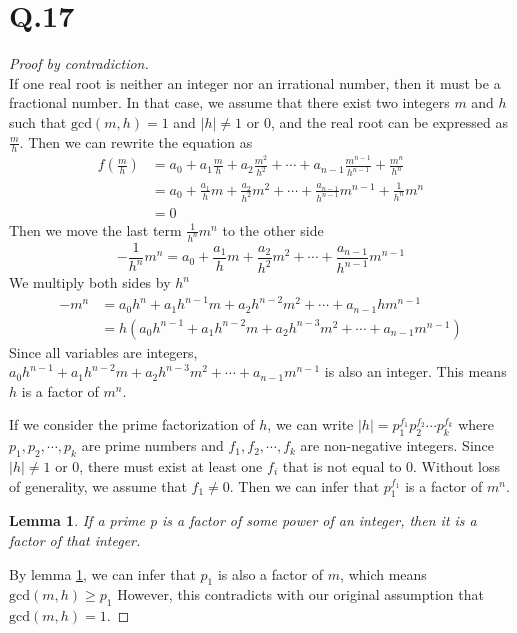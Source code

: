 \documentclass[a4paper,12pt]{article}
\newtheorem{lemma}{Lemma}
\begin{document}
\section*{Q.17}
\begin{proof}[Proof by contradiction]
	$ $\\
	If one real root is neither an integer nor an irrational number, then it must be a fractional number.
	In that case, we assume that there exist two integers $m$ and $h$ such that $\text{gcd} (m,h) = 1$ and $|h| \ne 1$ or $0$, and the real root can be expressed as $\frac{m}{h}$.
	Then we can rewrite the equation as 
	\begin{align*}
		f(\frac{m}{h}) &= a_0 + a_1\frac{m}{h} + a_2\frac{m^2}{h^2} + \cdots + a_{n-1}\frac{m^{n-1}}{h^{n-1}} + \frac{m^n}{h^n}\\
		&= a_0 + \frac{a_1}{h}m + \frac{a_2}{h^2}m^2 + \cdots + \frac{a_{n-1}}{h^{n-1}}m^{n-1} + \frac{1}{h^n}m^n\\
		&= 0
	\end{align*}
	Then we move the last term $\frac{1}{h^n}m^n$ to the other side
	\begin{equation*}
		- \frac{1}{h^n}m^n = a_0 + \frac{a_1}{h}m + \frac{a_2}{h^2}m^2 + \cdots + \frac{a_{n-1}}{h^{n-1}}m^{n-1}
	\end{equation*}
	We multiply both sides by $h^n$
	\begin{align*}
		-m^n &= a_0h^n + a_1h^{n-1}m + a_2h^{n-2}m^2 + \cdots + a_{n-1}hm^{n-1} \\
		&= h(a_0h^{n-1} + a_1h^{n-2}m + a_2h^{n-3}m^2 + \cdots + a_{n-1}m^{n-1})
	\end{align*}
	Since all variables are integers, $a_0h^{n-1} + a_1h^{n-2}m + a_2h^{n-3}m^2 + \cdots + a_{n-1}m^{n-1}$ is also an integer.
	This means $h$ is a factor of $m^n$.

	If we consider the prime factorization of $h$, we can write $|h| = p_1^{f_1}p_2^{f_2}\cdots p_k^{f_k}$ where $p_1,p_2,\cdots,p_k$ are prime numbers and $f_1,f_2,\cdots,f_k$ are non-negative integers.
	Since $|h| \ne 1$ or $0$, there must exist at least one $f_i$ that is not equal to $0$.
	Without loss of generality, we assume that $f_1 \ne 0$.
	Then we can infer that $p_1^{f_1}$ is a factor of $m^n$. 

	\begin{lemma}
		\label{lemma:3}
		If a prime p is a factor of some power of an integer, then it is a factor of that integer.
	\end{lemma}

	By lemma \ref{lemma:3}, we can infer that $p_1$ is also a factor of $m$, which means $\text{gcd} (m,h) \geq p_1$
	However, this contradicts with our original assumption that $\text{gcd} (m,h) = 1$.
\end{proof}
\end{document}
